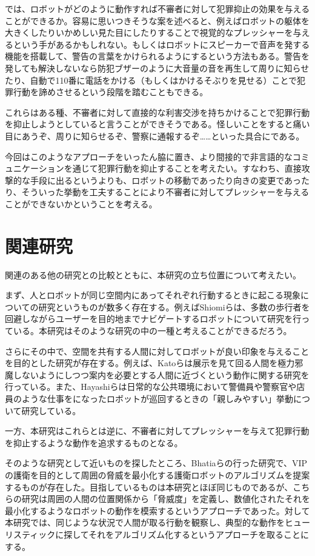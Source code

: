 \documentclass{kuisthesis}
\begin{document}
では、ロボットがどのように動作すれば不審者に対して犯罪抑止の効果を与えることができるか。容易に思いつきそうな案を述べると、例えばロボットの躯体を大きくしたりいかめしい見た目にしたりすることで視覚的なプレッシャーを与えるという手があるかもしれない。もしくはロボットにスピーカーで音声を発する機能を搭載して、警告の言葉をかけられるようにするという方法もある。警告を発しても解決しないなら防犯ブザーのように大音量の音を再生して周りに知らせたり、自動で110番に電話をかける（もしくはかけるそぶりを見せる）ことで犯罪行動を諦めさせるという段階を踏むこともできる。

これらはある種、不審者に対して直接的な利害交渉を持ちかけることで犯罪行動を抑止しようとしていると言うことができそうである。怪しいことをすると痛い目にあうぞ、周りに知らせるぞ、警察に通報するぞ……といった具合にである。

今回はこのようなアプローチをいったん脇に置き、より間接的で非言語的なコミュニケーションを通じて犯罪行動を抑止することを考えたい。すなわち、直接攻撃的な手段に出るというよりも、ロボットの移動であったり向きの変更であったり、そういった挙動を工夫することにより不審者に対してプレッシャーを与えることができないかということを考える。


\section{関連研究}
関連のある他の研究との比較とともに、本研究の立ち位置について考えたい。

まず、人とロボットが同じ空間内にあってそれぞれ行動するときに起こる現象についての研究というものが数多く存在する。例えばShiomiらは、多数の歩行者を回避しながらユーザーを目的地までナビゲートするロボットについて研究を行っている\cite{1}。本研究はそのような研究の中の一種と考えることができるだろう。

さらにその中で、空間を共有する人間に対してロボットが良い印象を与えることを目的とした研究が存在する。例えば、Katoらは展示を見て回る人間を極力邪魔しないようにしつつ案内を必要とする人間に近づくという動作に関する研究\cite{2}を行っている。また、Hayashiらは日常的な公共環境において警備員や警察官や店員のような仕事をになったロボットが巡回するときの「親しみやすい」挙動について研究している\cite{3}。

一方、本研究はこれらとは逆に、不審者に対してプレッシャーを与えて犯罪行動を抑止するような動作を追求するものとなる。

そのような研究として近いものを探したところ、Bhatiaらの行った研究で、VIPの護衛を目的として周囲の脅威を最小化する護衛ロボットのアルゴリズムを提案するもの\cite{4}が存在した。目指しているものは本研究とほぼ同じものであるが、こちらの研究は周囲の人間の位置関係から「脅威度」を定義し、数値化されたそれを最小化するようなロボットの動作を模索するというアプローチであった。対して本研究では、同じような状況で人間が取る行動を観察し、典型的な動作をヒューリスティックに探してそれをアルゴリズム化するというアプローチを取ることにする。
\end{document}

